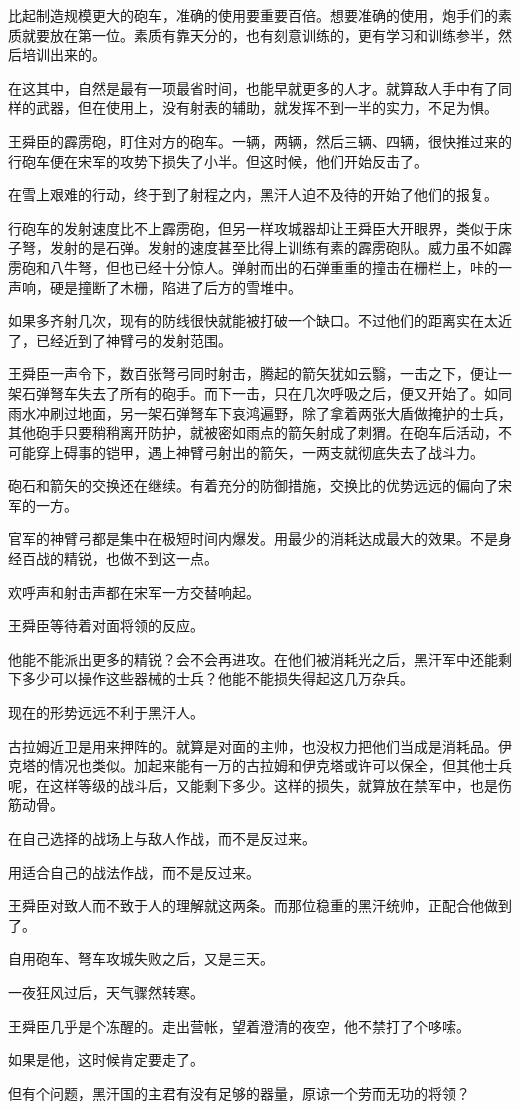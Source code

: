 比起制造规模更大的砲车，准确的使用要重要百倍。想要准确的使用，炮手们的素质就要放在第一位。素质有靠天分的，也有刻意训练的，更有学习和训练参半，然后培训出来的。

在这其中，自然是最有一项最省时间，也能早就更多的人才。就算敌人手中有了同样的武器，但在使用上，没有射表的辅助，就发挥不到一半的实力，不足为惧。

王舜臣的霹雳砲，盯住对方的砲车。一辆，两辆，然后三辆、四辆，很快推过来的行砲车便在宋军的攻势下损失了小半。但这时候，他们开始反击了。

在雪上艰难的行动，终于到了射程之内，黑汗人迫不及待的开始了他们的报复。

行砲车的发射速度比不上霹雳砲，但另一样攻城器却让王舜臣大开眼界，类似于床子弩，发射的是石弹。发射的速度甚至比得上训练有素的霹雳砲队。威力虽不如霹雳砲和八牛弩，但也已经十分惊人。弹射而出的石弹重重的撞击在栅栏上，咔的一声响，硬是撞断了木栅，陷进了后方的雪堆中。

如果多齐射几次，现有的防线很快就能被打破一个缺口。不过他们的距离实在太近了，已经近到了神臂弓的发射范围。

王舜臣一声令下，数百张弩弓同时射击，腾起的箭矢犹如云翳，一击之下，便让一架石弹弩车失去了所有的砲手。而下一击，只在几次呼吸之后，便又开始了。如同雨水冲刷过地面，另一架石弹弩车下哀鸿遍野，除了拿着两张大盾做掩护的士兵，其他砲手只要稍稍离开防护，就被密如雨点的箭矢射成了刺猬。在砲车后活动，不可能穿上碍事的铠甲，遇上神臂弓射出的箭矢，一两支就彻底失去了战斗力。

砲石和箭矢的交换还在继续。有着充分的防御措施，交换比的优势远远的偏向了宋军的一方。

官军的神臂弓都是集中在极短时间内爆发。用最少的消耗达成最大的效果。不是身经百战的精锐，也做不到这一点。

欢呼声和射击声都在宋军一方交替响起。

王舜臣等待着对面将领的反应。

他能不能派出更多的精锐？会不会再进攻。在他们被消耗光之后，黑汗军中还能剩下多少可以操作这些器械的士兵？他能不能损失得起这几万杂兵。

现在的形势远远不利于黑汗人。

古拉姆近卫是用来押阵的。就算是对面的主帅，也没权力把他们当成是消耗品。伊克塔的情况也类似。加起来能有一万的古拉姆和伊克塔或许可以保全，但其他士兵呢，在这样等级的战斗后，又能剩下多少。这样的损失，就算放在禁军中，也是伤筋动骨。

在自己选择的战场上与敌人作战，而不是反过来。

用适合自己的战法作战，而不是反过来。

王舜臣对致人而不致于人的理解就这两条。而那位稳重的黑汗统帅，正配合他做到了。

自用砲车、弩车攻城失败之后，又是三天。

一夜狂风过后，天气骤然转寒。

王舜臣几乎是个冻醒的。走出营帐，望着澄清的夜空，他不禁打了个哆嗦。

如果是他，这时候肯定要走了。

但有个问题，黑汗国的主君有没有足够的器量，原谅一个劳而无功的将领？
